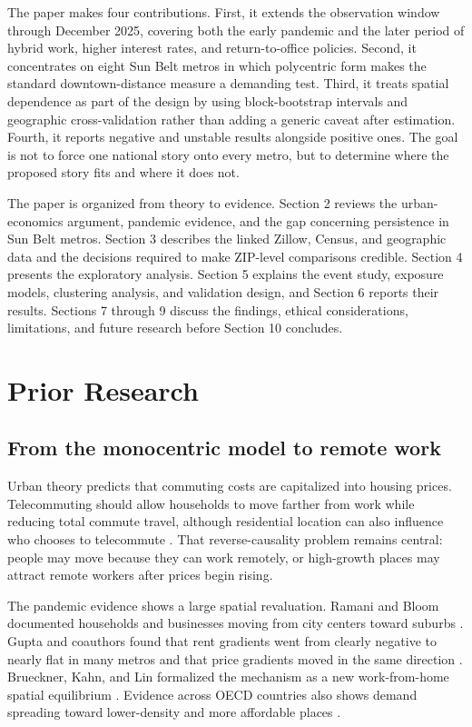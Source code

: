 \documentclass[11pt]{article}
\begin{document}
The paper makes four contributions. First, it extends the observation window through December 2025, covering both the early
pandemic and the later period of hybrid work, higher interest rates, and return-to-office policies. Second, it concentrates on
eight Sun Belt metros in which polycentric form makes the standard downtown-distance measure a demanding test. Third, it treats
spatial dependence as part of the design by using block-bootstrap intervals and geographic cross-validation rather than adding a
generic caveat after estimation. Fourth, it reports negative and unstable results alongside positive ones. The goal is not to
force one national story onto every metro, but to determine where the proposed story fits and where it does not.

The paper is organized from theory to evidence. Section 2 reviews the urban-economics argument, pandemic evidence,
and the gap concerning persistence in Sun Belt metros. Section 3 describes the linked Zillow, Census, and geographic data and the
decisions required to make ZIP-level comparisons credible. Section 4 presents the exploratory analysis. Section 5 explains the
event study, exposure models, clustering analysis, and validation design, and Section 6 reports their results. Sections 7 through
9 discuss the findings, ethical considerations, limitations, and future research before Section 10 concludes.

\section{Prior Research}

\subsection{From the monocentric model to remote work}

Urban theory predicts that commuting costs are capitalized into housing prices. Telecommuting should allow households to move
farther from work while reducing total commute travel, although residential location can also influence who chooses to telecommute
\cite{mokhtarian2004telecommuting}. That reverse-causality problem remains central: people may move because they can work remotely,
or high-growth places may attract remote workers after prices begin rising.

The pandemic evidence shows a large spatial revaluation. Ramani and Bloom documented households and businesses moving from city
centers toward suburbs \cite{ramani2021donut}. Gupta and coauthors found that rent gradients went from clearly negative to nearly
flat in many metros and that price gradients moved in the same direction \cite{gupta2022flattening}. Brueckner, Kahn, and Lin
formalized the mechanism as a new work-from-home spatial equilibrium \cite{brueckner2023spatial}. Evidence across OECD countries
also shows demand spreading toward lower-density and more affordable places \cite{ahrend2023expanding}.
\end{document}
